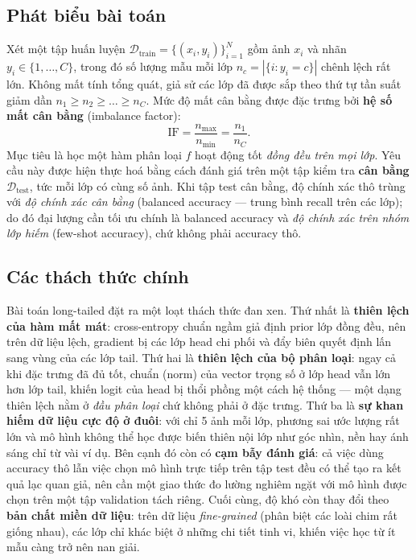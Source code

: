 \subsection{Phát biểu bài toán}

Xét một tập huấn luyện $\mathcal{D}_{\text{train}}=\{(x_i,y_i)\}_{i=1}^{N}$ gồm ảnh $x_i$ và nhãn
$y_i\in\{1,\dots,C\}$, trong đó số lượng mẫu mỗi lớp $n_c=|\{i: y_i=c\}|$ chênh lệch rất lớn. Không
mất tính tổng quát, giả sử các lớp đã được sắp theo thứ tự tần suất giảm dần
$n_1 \ge n_2 \ge \dots \ge n_C$. Mức độ mất cân bằng được đặc trưng bởi \textbf{hệ số mất cân bằng}
(imbalance factor):
\begin{equation}
\text{IF} = \frac{n_{\max}}{n_{\min}} = \frac{n_1}{n_C}.
\end{equation}
Mục tiêu là học một hàm phân loại $f$ hoạt động tốt \emph{đồng đều trên mọi lớp}. Yêu cầu này được
hiện thực hoá bằng cách đánh giá trên một tập kiểm tra \textbf{cân bằng} $\mathcal{D}_{\text{test}}$,
tức mỗi lớp có cùng số ảnh. Khi tập test cân bằng, độ chính xác thô trùng với \emph{độ chính xác cân
bằng} (balanced accuracy --- trung bình recall trên các lớp); do đó đại lượng cần tối ưu chính là
balanced accuracy và \emph{độ chính xác trên nhóm lớp hiếm} (few-shot accuracy), chứ không phải
accuracy thô.

\subsection{Các thách thức chính}

Bài toán long-tailed đặt ra một loạt thách thức đan xen. Thứ nhất là \textbf{thiên lệch của hàm mất
mát}: cross-entropy chuẩn ngầm giả định prior lớp đồng đều, nên trên dữ liệu lệch, gradient bị các
lớp head chi phối và đẩy biên quyết định lấn sang vùng của các lớp tail. Thứ hai là \textbf{thiên
lệch của bộ phân loại}: ngay cả khi đặc trưng đã đủ tốt, chuẩn (norm) của vector trọng số ở lớp head
vẫn lớn hơn lớp tail, khiến logit của head bị thổi phồng một cách hệ thống --- một dạng thiên lệch
nằm ở \emph{đầu phân loại} chứ không phải ở đặc trưng. Thứ ba là \textbf{sự khan hiếm dữ liệu cực độ
ở đuôi}: với chỉ 5 ảnh mỗi lớp, phương sai ước lượng rất lớn và mô hình không thể học được biến
thiên nội lớp như góc nhìn, nền hay ánh sáng chỉ từ vài ví dụ. Bên cạnh đó còn có \textbf{cạm bẫy
đánh giá}: cả việc dùng accuracy thô lẫn việc chọn mô hình trực tiếp trên tập test đều có thể tạo ra
kết quả lạc quan giả, nên cần một giao thức đo lường nghiêm ngặt với mô hình được chọn trên một tập
validation tách riêng. Cuối cùng, độ khó còn thay đổi theo \textbf{bản chất miền dữ liệu}: trên dữ
liệu \emph{fine-grained} (phân biệt các loài chim rất giống nhau), các lớp chỉ khác biệt ở những chi
tiết tinh vi, khiến việc học từ ít mẫu càng trở nên nan giải.

